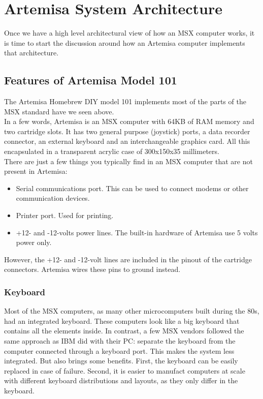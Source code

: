 \chapter{Artemisa System Architecture}

Once we have a high level architectural view of how an MSX computer works, it is time to start the discussion around how an Artemisa computer implements that architecture.

\section{Features of Artemisa Model 101}

The Artemisa Homebrew DIY model 101 implements most of the parts of the MSX standard have we seen above. \\

In a few words, Artemisa is an MSX computer with 64KB of RAM memory and two cartridge slots. It has two general purpose (joystick) ports, a data recorder connector, an external keyboard and an interchangeable graphics card. All this encapsulated in a transparent acrylic case of 300x150x35 millimeters.\\

There are just a few things you typically find in an MSX computer that are not present in Artemisa:

\begin{itemize}
  \item Serial communications port. This can be used to connect modems or other communication devices.
  \item Printer port. Used for printing.
  \item +12- and -12-volts power lines. The built-in hardware of Artemisa use 5 volts power only.
\end{itemize}

However, the +12- and -12-volt lines are included in the pinout of the cartridge connectors. Artemisa wires these pins to ground instead.

\subsection{Keyboard}

Most of the MSX computers, as many other microcomputers built during the 80s, had an integrated keyboard. These computers look like a big keyboard that contains all the elements inside. In contrast, a few MSX vendors followed the same approach as IBM did with their PC: separate the keyboard from the computer connected through a keyboard port. This makes the system less integrated. But also brings some benefits. First, the keyboard can be easily replaced in case of failure. Second, it is easier to manufact computers at scale with different keyboard distributions and layouts, as they only differ in the keyboard. \\

